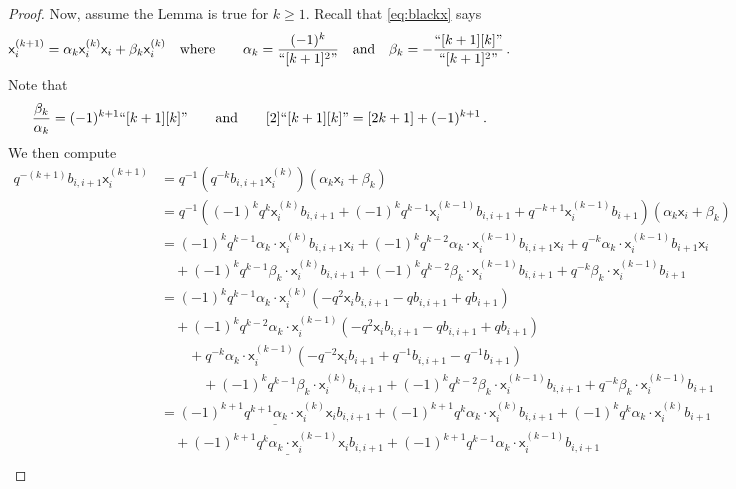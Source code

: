 \documentclass[10pt]{amsart}
\numberwithin{equation}{section}
\theoremstyle{definition}
\newcommand{\xxb}{\mathsf{x}}
\begin{document}
\begin{proof}
Now, assume the Lemma is true for $k\ge 1$. 
Recall that \eqref{eq:blackx} says
\begin{equation}\label{eqn:alpha-beta-dividedpowerrecursion}
\xxb_i^{(k+1)} = \alpha_k \xxb_i^{(k)}\xxb_i + \beta_k \xxb_i^{(k)} 
\quad \text{where} \qquad \alpha_k = \frac{(-1)^k}{``[k+1]^2"} \quad \text{and} \quad \beta_k = -\frac{``[k+1][k]"}{``[k+1]^2"} \, .
\end{equation}
Note that 
\begin{equation}\label{eqn:2-times-beta-over-alpha}
\frac{\beta_k}{\alpha_k} = (-1)^{k+1}``[k+1][k]" \qquad \text{and} \qquad [2]``[k+1][k]" = [2k+1] + (-1)^{k+1} \, .
\end{equation}
We then compute
\begin{align*}
q^{-(k+1)}b_{i,i+1}\xxb_{i}^{(k+1)} &= q^{-1}\left(q^{-k}b_{i,i+1} \xxb_{i}^{(k)}\right)(\alpha_k\xxb_{i} + \beta_k) \\
&=q^{-1} \left((-1)^kq^{k}\xxb_{i}^{(k)}b_{i,i+1} + (-1)^kq^{k-1}\xxb_i^{(k-1)}b_{i,i+1} + q^{-k+1}\xxb_i^{(k-1)}b_{i+1}\right)(\alpha_k\xxb_{i} + \beta_k) \\
&= (-1)^kq^{k-1}\alpha_k\cdot\xxb_{i}^{(k)}b_{i,i+1}\xxb_{i} + (-1)^kq^{k-2}\alpha_k\cdot\xxb_i^{(k-1)}b_{i,i+1}\xxb_{i} + q^{-k}\alpha_k\cdot\xxb_i^{(k-1)}b_{i+1}\xxb_{i} \\
	&\quad+ (-1)^kq^{k-1}\beta_k\cdot\xxb_{i}^{(k)}b_{i,i+1} + (-1)^kq^{k-2}\beta_k\cdot\xxb_i^{(k-1)}b_{i,i+1} + q^{-k}\beta_k\cdot \xxb_i^{(k-1)}b_{i+1} \\
&= (-1)^kq^{k-1}\alpha_k\cdot\xxb_{i}^{(k)}\left(-q^2\xxb_{i}b_{i,i+1} -qb_{i,i+1} + qb_{i+1}\right) \\
	&\quad + (-1)^kq^{k-2}\alpha_k\cdot\xxb_i^{(k-1)}\left(-q^2\xxb_{i}b_{i,i+1} -qb_{i,i+1} + qb_{i+1}\right) \\
	&\qquad + q^{-k}\alpha_k\cdot\xxb_i^{(k-1)}\left(-q^{-2}\xxb_{i}b_{i+1} + q^{-1}b_{i,i+1} - q^{-1}b_{i+1}\right) \\
	&\qquad \quad + (-1)^kq^{k-1}\beta_k\cdot\xxb_{i}^{(k)}b_{i,i+1} + (-1)^kq^{k-2}\beta_k\cdot\xxb_i^{(k-1)}b_{i,i+1} + q^{-k}\beta_k\cdot \xxb_i^{(k-1)}b_{i+1} \\
&= \underline{(-1)^{k+1}q^{k+1}\alpha_k\cdot\xxb_{i}^{(k)}\xxb_{i}b_{i,i+1}} + (-1)^{k+1}q^{k}\alpha_k\cdot\xxb_{i}^{(k)}b_{i,i+1} 
		+ (-1)^kq^{k}\alpha_k\cdot\xxb_{i}^{(k)}b_{i+1} \\
	&\quad + \underline{(-1)^{k+1}q^{k}\alpha_k\cdot\xxb_i^{(k-1)}\xxb_{i}b_{i,i+1}} + (-1)^{k+1}q^{k-1}\alpha_k\cdot\xxb_i^{(k-1)}b_{i,i+1} \\

\end{align*}
\end{proof}
\end{document}
